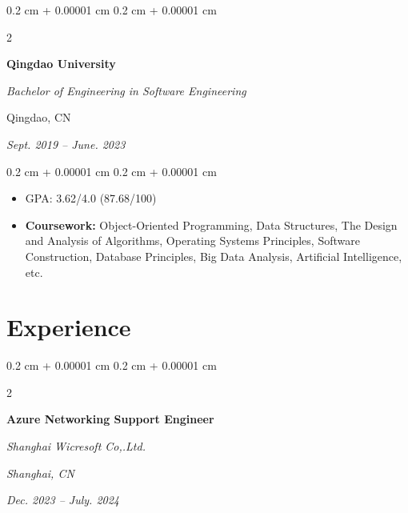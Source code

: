 \documentclass[10pt, letterpaper]{article}
\newenvironment{highlights}{
    \begin{itemize}[
        topsep=0.10 cm,
        parsep=0.10 cm,
        partopsep=0pt,
        itemsep=0pt,
        leftmargin=0.4 cm + 10pt
    ]
}{
    \end{itemize}
} %
\newenvironment{onecolentry}{
    \begin{adjustwidth}{
        0.2 cm + 0.00001 cm
    }{
        0.2 cm + 0.00001 cm
    }
}{
    \end{adjustwidth}
} %
\newenvironment{twocolentry}[2][]{
    \onecolentry
    \def\secondColumn{#2}
    \setcolumnwidth{\fill, 4.5 cm}
    \begin{paracol}{2}
}{
    \switchcolumn \raggedleft \secondColumn
    \end{paracol}
    \endonecolentry
} %
\let\hrefWithoutArrow\href
\renewcommand{\href}[2]{\hrefWithoutArrow{#1}{\ifthenelse{\equal{#2}{}}{ }{#2 }\raisebox{.15ex}{\footnotesize \faExternalLink*}}}
\begin{document}
        \vspace{0.20 cm}

\begin{twocolentry}{
         Qingdao, CN   
            
        \textit{Sept. 2019 – June. 2023}}
            \textbf{Qingdao University}

            \textit{Bachelor of Engineering in Software Engineering}
        \end{twocolentry}

        \vspace{0.10 cm}
        \begin{onecolentry}
            \begin{highlights}
                \item GPA: 3.62/4.0 (87.68/100)
                \item \textbf{Coursework:} Object-Oriented Programming, Data Structures, The Design and Analysis of Algorithms, 
Operating Systems Principles, Software Construction, Database Principles, Big Data Analysis, Artificial Intelligence, etc.
            \end{highlights}
        \end{onecolentry}


    
    \section{Experience}



        
        \begin{twocolentry}{
        \textit{Shanghai, CN}    
            
        \textit{Dec. 2023 – July. 2024}}
            \textbf{Azure Networking Support Engineer }
            
            \textit{Shanghai Wicresoft Co,.Ltd.}
        \end{twocolentry}
\end{document}
